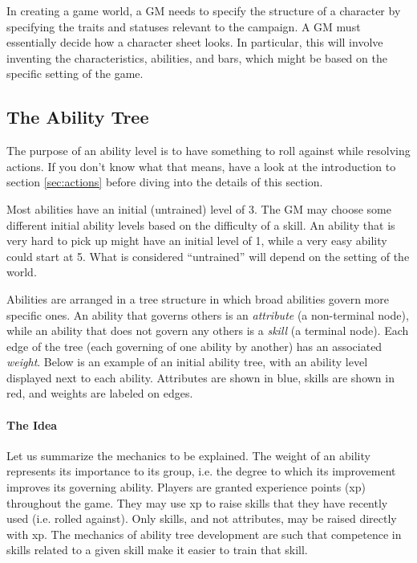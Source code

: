 \documentclass[12pt]{article}
\begin{document}
In creating a game world, a GM needs to specify the structure of a character by specifying the traits and statuses relevant to the campaign. A GM must essentially decide how a character sheet looks. In particular, this will involve inventing the characteristics, abilities, and bars, which might be based on the specific setting of the game.

\subsection{The Ability Tree}\label{sec:tree}			

The purpose of an ability level is to have something to roll against while resolving actions. If you don't know what that means, have a look at the introduction to section \ref{sec:actions} before diving into the details of this section.

Most abilities have an initial (untrained) level of 3. The GM may choose some different initial ability levels based on the difficulty of a skill. An ability that is very hard to pick up might have an initial level of 1, while a very easy ability could start at 5. What is considered ``untrained'' will depend on the setting of the world.

Abilities are arranged in a tree structure in which broad abilities govern more specific ones.
An ability that governs others is an \emph{attribute} (a non-terminal node), while an ability that does not govern any others is a \emph{skill} (a terminal node).
Each edge of the tree (each governing of one ability by another) has an associated \emph{weight}.
Below is an example of an initial ability tree, with an ability level displayed next to each ability.
Attributes are shown in blue, skills are shown in red, and weights are labeled on edges.

\begin{center}

\end{center}

\paragraph{The Idea} Let us summarize the mechanics to be explained. The weight of an ability represents its importance to its group, i.e. the degree to which its improvement improves its governing ability.
Players are granted experience points (xp) throughout the game. They may use xp to raise skills that they have recently used (i.e. rolled against). Only skills, and not attributes, may be raised directly with xp.
The mechanics of ability tree development are such that competence in skills related to a given skill make it easier to train that skill.
\end{document}
